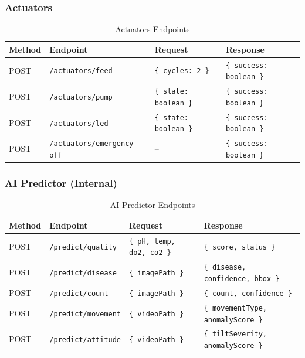 \documentclass[12pt,a4paper,oneside]{article}
\begin{document}
\subsubsection{Actuators}
\begin{table}[H]
    \centering
    \begin{tabularx}{\textwidth}{llYY}
        \toprule
        \textbf{Method} & \textbf{Endpoint} & \textbf{Request} & \textbf{Response} \\
        \midrule
        POST & \texttt{/actuators/feed} & \texttt{\{ cycles: 2 \}} & \texttt{\{ success: boolean \}} \\
        POST & \texttt{/actuators/pump} & \texttt{\{ state: boolean \}} & \texttt{\{ success: boolean \}} \\
        POST & \texttt{/actuators/led} & \texttt{\{ state: boolean \}} & \texttt{\{ success: boolean \}} \\
        POST & \texttt{/actuators/emergency-off} & -- & \texttt{\{ success: boolean \}} \\
        \bottomrule
    \end{tabularx}
    \caption{Actuators Endpoints}
\end{table}

\subsubsection{AI Predictor (Internal)}
\begin{table}[H]
    \centering
    \begin{tabularx}{\textwidth}{llYY}
        \toprule
        \textbf{Method} & \textbf{Endpoint} & \textbf{Request} & \textbf{Response} \\
        \midrule
        POST & \texttt{/predict/quality} & \texttt{\{ pH, temp, do2, co2 \}} & \texttt{\{ score, status \}} \\
        POST & \texttt{/predict/disease} & \texttt{\{ imagePath \}} & \texttt{\{ disease, confidence, bbox \}} \\
        POST & \texttt{/predict/count} & \texttt{\{ imagePath \}} & \texttt{\{ count, confidence \}} \\
        POST & \texttt{/predict/movement} & \texttt{\{ videoPath \}} & \texttt{\{ movementType, anomalyScore \}} \\
        POST & \texttt{/predict/attitude} & \texttt{\{ videoPath \}} & \texttt{\{ tiltSeverity, anomalyScore \}} \\
        \bottomrule
    \end{tabularx}
    \caption{AI Predictor Endpoints}
\end{table}
\end{document}
